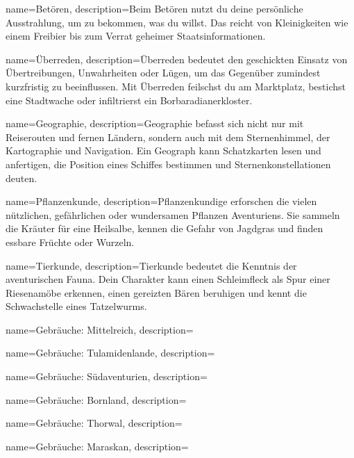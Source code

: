{
    name={Betören},
    description={Beim Betören nutzt du deine persönliche Ausstrahlung, um zu bekommen, was du willst. Das reicht von Kleinigkeiten wie einem Freibier bis zum Verrat geheimer Staatsinformationen.}
}


{
    name={Überreden},
    description={Überreden bedeutet den geschickten Einsatz von Übertreibungen, Unwahrheiten oder Lügen, um das Gegenüber zumindest kurzfristig zu beeinflussen. Mit Überreden feilschst du am Marktplatz, bestichst eine Stadtwache oder infiltrierst ein Borbaradianerkloster.}
}


{
    name={Geographie},
    description={Geographie befasst sich nicht nur mit Reiserouten und fernen Ländern, sondern auch mit dem Sternenhimmel, der Kartographie und Navigation. Ein Geograph kann Schatzkarten lesen und anfertigen, die Position eines Schiffes bestimmen und Sternenkonstellationen deuten.}
}


{
    name={Pflanzenkunde},
    description={Pflanzenkundige erforschen die vielen nützlichen, gefährlichen oder wundersamen Pflanzen Aventuriens. Sie sammeln die Kräuter für eine Heilsalbe, kennen die Gefahr von Jagdgras und finden essbare Früchte oder Wurzeln.}
}


{
    name={Tierkunde},
    description={Tierkunde bedeutet die Kenntnis der aventurischen Fauna. Dein Charakter kann einen Schleimfleck als Spur einer Riesenamöbe erkennen, einen gereizten Bären beruhigen und kennt die Schwachstelle eines Tatzelwurms.}
}


{
    name={Gebräuche: Mittelreich},
    description={}
}


{
    name={Gebräuche: Tulamidenlande},
    description={}
}


{
    name={Gebräuche: Südaventurien},
    description={}
}


{
    name={Gebräuche: Bornland},
    description={}
}


{
    name={Gebräuche: Thorwal},
    description={}
}


{
    name={Gebräuche: Maraskan},
    description={}
}


